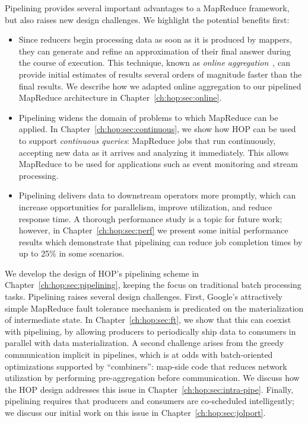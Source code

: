 Pipelining provides several important advantages to a MapReduce
framework, but also raises new design challenges. We highlight the
potential benefits first:
\begin{itemize}
\item
  Since reducers begin processing data as soon as it is produced by mappers,
  they can generate and refine an approximation of their final answer during the
  course of execution. This technique, known as {\em online
    aggregation}~\cite{onlineagg}, can provide initial estimates of results
  several orders of magnitude faster than the final results.  We
  describe how we adapted online aggregation to our pipelined MapReduce
  architecture in Chapter~\ref{ch:hop:sec:online}.

\item
  Pipelining widens the domain of problems to which MapReduce can be applied. In
  Chapter~\ref{ch:hop:sec:continuous}, we show how HOP can be used to support
  {\em continuous queries}: MapReduce jobs that run continuously, accepting new
  data as it arrives and analyzing it immediately. This allows MapReduce to be
  used for applications such as event monitoring and stream processing.

\item
  Pipelining delivers data to downstream operators more promptly, which can
  increase opportunities for parallelism, improve utilization, and reduce
  response time. A thorough performance study is a topic for future work;
  however, in Chapter~\ref{ch:hop:sec:perf} we present some initial performance
  results which demonstrate that pipelining can reduce job completion times by
  up to 25\% in some scenarios.
\end{itemize}

We develop the design of HOP's pipelining scheme in
Chapter~\ref{ch:hop:sec:pipelining}, keeping the focus on traditional batch
processing tasks.  Pipelining raises several design challenges.  First,
Google's attractively simple MapReduce fault tolerance mechanism is predicated
on the materialization of intermediate state.  In Chapter~\ref{ch:hop:sec:ft},
we show that this can coexist with pipelining, by allowing producers to
periodically ship data to consumers in parallel with data materialization.  A
second challenge arises from the greedy communication implicit in pipelines,
which is at odds with batch-oriented optimizations supported by ``combiners'':
map-side code that reduces network utilization by performing pre-aggregation
before communication.  We discuss how the HOP design addresses this issue in
Chapter~\ref{ch:hop:sec:intra-pipe}.  Finally, pipelining requires that
producers and consumers are co-scheduled intelligently; we discuss our initial
work on this issue in Chapter~\ref{ch:hop:sec:jolport}.

